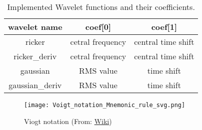 \begin{table}[h!]
\centering
\caption{Implemented Wavelet functions and their coefficients.}
\label{table_wavelet}
\begin{tabular}{| c | c | c |}
\hline
   wavelet name  &   coef[0]    &   coef[1] \\
\hline
    ricker        &   cetral frequency  &  central time shift \\
\hline
   ricker\_deriv  &   cetral frequency  &  central time shift \\
\hline
    gaussian      &    RMS value  &  time shift \\
\hline
  gaussian\_deriv  &   RMS value  &  time shift \\
\hline
\end{tabular}
\end{table}


\begin{figure}
    \centering
    \texttt{[image: Voigt\_notation\_Mnemonic\_rule\_svg.png]}
    \caption{Viogt notation (From: \href{https://en.wikipedia.org/wiki/Voigt_notation}{Wiki})}
    \label{fig_voigt}
\end{figure}


